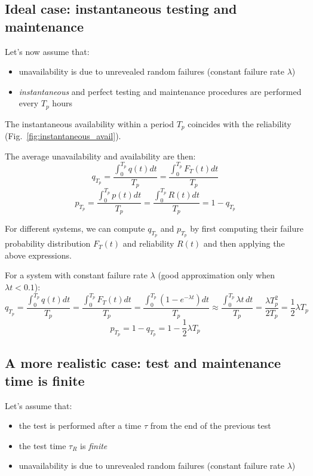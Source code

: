 \subsection{Ideal case: instantaneous testing and maintenance}
Let's now assume that:
\begin{itemize}
    \item unavailability is due to unrevealed random failures (constant failure
    rate $\lambda$)
    \item \emph{instantaneous} and perfect testing and maintenance procedures
    are performed every $T_p$ hours
\end{itemize}

The instantaneous availability within a period $T_p$ coincides with the
reliability (Fig.~\ref{fig:instantaneous_avail}).

The average unavailability and availability are then:
\begin{equation*}
    q_{T_p} = \frac{\int_0^{T_p}q(t)dt}{T_p}  = \frac{\int_0^{T_p}F_T(t)dt}{T_p}
\end{equation*}
\begin{equation*}
    p_{T_p} = \frac{\int_0^{T_p}p(t)dt}{T_p}  = \frac{\int_0^{T_p}R(t)dt}{T_p} = 1-q_{T_p}
\end{equation*}

For different systems, we can compute $q_{T_p}$ and $p_{T_p}$ by first computing
their failure probability distribution $F_T(t)$ and reliability $R(t)$ and then
applying the above expressions.

For a system with constant failure rate $\lambda$ (good approximation only when
$\lambda t < 0.1$):
\begin{equation*}
    q_{T_p} = \frac{\int_0^{T_p}q(t)dt}{T_p}  = \frac{\int_0^{T_p}F_T(t)dt}{T_p} = \frac{\int_0^{T_p}(1-e^{-\lambda t})dt}{T_p} \approx \frac{\int_0^{T_p}\lambda t\,dt}{T_p} = \frac{\lambda T_p^2}{2T_p} = \frac{1}{2}\lambda T_p
\end{equation*}
\begin{equation*}
    p_{T_p} = 1-q_{T_p} = 1-\frac{1}{2}\lambda T_p
\end{equation*}

\subsection{A more realistic case: test and maintenance time is finite}
Let's assume that:
\begin{itemize}
    \item the test is performed after a time $\tau$ from the end of the previous test
    \item the test time $\tau_R$ is \emph{finite}
    \item unavailability is due to unrevealed random failures (constant failure rate $\lambda$)
\end{itemize}

